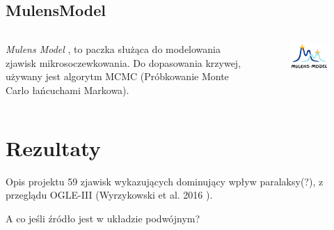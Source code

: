 \documentclass{beamer}
\begin{document}
\subsection{MulensModel}
\begin{frame}
    \begin{columns}
        \begin{column}{0.5\linewidth}
            \emph{Mulens Model} \cite{MulensModel_paper}, to paczka służąca do modelowania zjawisk mikrosoczewkowania.
            Do dopasowania krzywej, używany jest algorytm MCMC (Próbkowanie Monte Carlo łańcuchami Markowa).

        \end{column}

        \begin{column}{0.5\linewidth}
            \begin{figure}
                \includegraphics[width = \textwidth]{logoMM_crop_4_372x260.png}
            \end{figure}
        \end{column}
    \end{columns}
\end{frame}

\section{Rezultaty}

\begin{frame}{Opis projektu}
    59 zjawisk wykazujących dominujący wpływ paralaksy(?), z przeglądu OGLE-III (Wyrzykowski et al. 2016 \cite{Basis_paper}).

    \bigskip
    \bigskip

    A co jeśli źródło jest w układzie podwójnym?
\end{frame}
\end{document}
